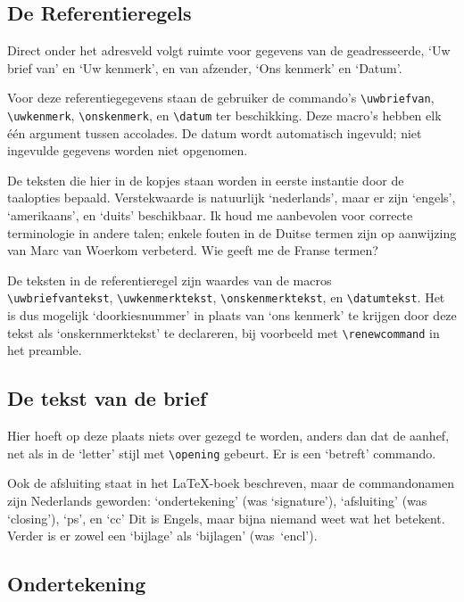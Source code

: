 \documentclass[a4paper,10pt]{artikel1}
\begin{document}
 
\subsection{De Referentieregels}
 
Direct onder het adresveld volgt ruimte voor gegevens van de
geadresseerde, `Uw brief van' en `Uw kenmerk', en van afzender, `Ons
kenmerk' en `Datum'.
 
Voor deze referentiegegevens staan de gebruiker de commando's
\verb.\uwbriefvan., \verb.\uwkenmerk., \verb.\onskenmerk., en
\verb.\datum. ter beschikking.  Deze macro's hebben elk \'e\'en
argument tussen accolades.  De datum wordt automatisch ingevuld; niet
ingevulde gegevens worden niet opgenomen.
 
De teksten die hier in de kopjes staan worden in eerste instantie door
de taalopties bepaald.  Verstekwaarde is natuurlijk `nederlands', maar
er zijn `engels', `amerikaans', en `duits' beschikbaar.  Ik houd me
aanbevolen voor correcte terminologie in andere talen; enkele fouten
in de Duitse termen zijn op aanwijzing van Marc van Woerkom verbeterd.
Wie geeft me de Franse termen?
 
De teksten in de referentieregel zijn waardes van de macros\\
\verb.\uwbriefvantekst., \verb.\uwkenmerktekst.,
\verb.\onskenmerktekst., en \verb.\datumtekst..  Het is dus mogelijk
`doorkiesnummer' in plaats van `ons kenmerk' te krijgen door deze
tekst als `onskernmerktekst' te declareren, bij voorbeeld met
\verb.\renewcommand. in het preamble.
 
 
\subsection{De tekst van de brief}
 
Hier hoeft op deze plaats niets over gezegd te worden, anders dan dat
de aanhef, net als in de `letter' stijl met \verb.\opening. gebeurt.
Er is een `betreft' commando.
 
Ook de afsluiting staat in het \LaTeX-boek beschreven, maar de
commandonamen zijn Nederlands geworden: `ondertekening' (was
`signature'), `afsluiting' (was `closing'), `ps', en `cc' Dit is
Engels, maar bijna niemand weet wat het betekent.  Verder is er zowel
een `bijlage' als `bijlagen' (was~`encl').
 
\subsection{Ondertekening}
 
\end{document}
